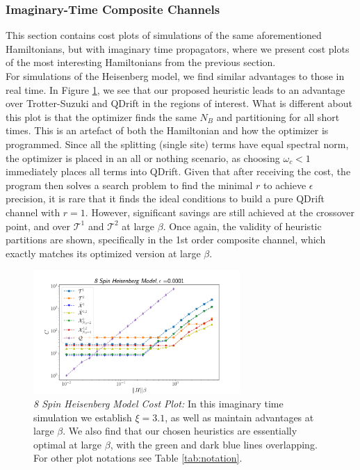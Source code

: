 \subsubsection{Imaginary-Time Composite Channels} \label{subsubsec:iTime_results}
This section contains cost plots of simulations of the same aforementioned Hamiltonians, but with imaginary time propagators, where we present cost plots of the most interesting Hamiltonians from the previous section.\\

For simulations of the Heisenberg model, we find similar advantages to those in real time. In Figure \ref{fig:imag_sim}, we see that our proposed heuristic leads to an advantage over Trotter-Suzuki and QDrift in the regions of interest. What is different about this plot is that the optimizer finds the same $N_B$ and partitioning for all short times. This is an artefact of both the Hamiltonian and how the optimizer is programmed. Since all the splitting (single site) terms have equal spectral norm, the optimizer is placed in an all or nothing scenario, as choosing $\omega_c < 1$ immediately places all terms into QDrift. Given that after receiving the cost, the program then solves a search problem to find the minimal $r$ to achieve $\epsilon$ precision, it is rare that it finds the ideal conditions to build a pure QDrift channel with $r=1$. However, significant savings are still achieved at the crossover point, and over $\mathcal{T}^1$ and $\mathcal{T}^2$ at large $\beta$. Once again, the validity of heuristic partitions are shown, specifically in the 1st order composite channel, which exactly matches its optimized version at large $\beta$. \\

\begin{figure}[htbp!]
    \centering
    \includegraphics[width=0.7\textwidth]{composite_numerics/iHeisenberg8.png}
    \caption{\textit{8 Spin Heisenberg Model Cost Plot:} In this imaginary time simulation we establish $\xi = 3.1$, as well as maintain advantages at large $\beta$. We also find that our chosen heuristics are essentially optimal at large $\beta$, with the green and dark blue lines overlapping. For other plot notations see Table \ref{tab:notation}.} \label{fig:imag_sim}
\end{figure} 
\FloatBarrier


